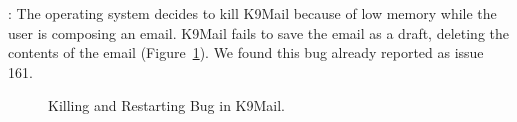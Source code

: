 : The operating system decides to kill K9Mail because of low memory while the user is composing an email. K9Mail fails to save the email as a draft, deleting the contents of the email (Figure~\ref{fig:bug17}). We found this bug already reported as issue 161.
\begin{figure}[!t]
\centering
\begin{minipage}{.8\columnwidth}
\hfill
{}
\hfill
{}
\caption{Killing and Restarting Bug in K9Mail.}
\label{fig:bug17}
\end{minipage}
\end{figure}

